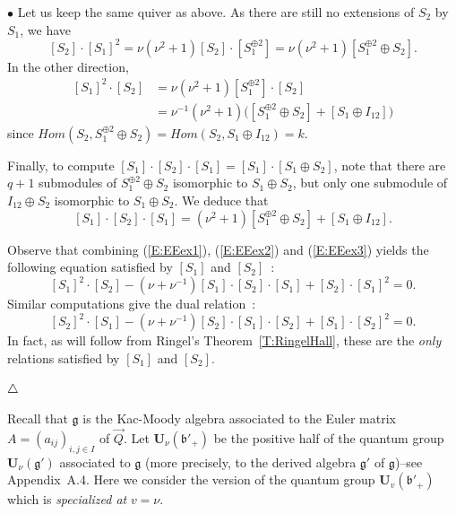 \documentclass[a4paper,10pt]{amsart}
\def\U{\mathbf{U}}
\def\endexample{$\hfill \triangle$}
\def\g{\mathfrak{g}}
\def\bo{\mathfrak{b}}
\def\v{\nu}
\numberwithin{equation}{section}
\begin{document}
\vspace{.05in}

\noindent
$\bullet$ Let us keep the same quiver as above. As there are still no extensions of $S_2$ by $S_1$, we have
\begin{equation}\label{E:EEex1}
[S_2] \cdot [S_1]^2 =\v(\v^2+1)[S_2] \cdot [S_1^{\oplus 2}]= \v(\v^2+1)[S_1^{\oplus 2} \oplus S_2].
\end{equation}
In the other direction,
\begin{equation}\label{E:EEex2}
\begin{split}
[S_1]^2 \cdot [S_2]&= \v(\v^2+1)[S_1^{\oplus 2}] \cdot [S_2]\\
&=\v^{-1}(\v^2+1)\big( [S_1^{\oplus 2} \oplus S_2] + [S_1 \oplus I_{12}] \big)
\end{split}
\end{equation}
since ${Hom}(S_2,S_1^{\oplus 2} \oplus S_2)={Hom}(S_2, S_1 \oplus I_{12})=k$.

Finally, to compute $[S_1] \cdot [S_2] \cdot [S_1]=[S_1] \cdot [S_1 \oplus S_2]$, note that there are $q+1$ submodules of $S_1^{\oplus 2} \oplus S_2$ isomorphic to $S_1 \oplus S_2$, but only one submodule of $I_{12} \oplus S_2$ isomorphic to $S_1 \oplus S_2$. We deduce that
\begin{equation}\label{E:EEex3}
[S_1] \cdot [S_2] \cdot [S_1]= (\v^2+1) [S_1^{\oplus 2} \oplus S_2] + [S_1 \oplus I_{12}].
\end{equation}

Observe that combining (\ref{E:EEex1}), (\ref{E:EEex2}) and (\ref{E:EEex3}) yields the following equation satisfied by $[S_1]$ and $[S_2]$~:
\begin{equation}\label{E:rk21}
[S_1]^2 \cdot [S_2] - (\v+\v^{-1})[S_1]\cdot [S_2] \cdot [S_1] + [S_2] \cdot [S_1]^2=0.
\end{equation}
Similar computations give the dual relation~:
\begin{equation}\label{E:rk22}
[S_2]^2 \cdot [S_1] - (\v+\v^{-1})[S_2]\cdot [S_1] \cdot [S_2] + [S_1] \cdot [S_2]^2=0.
\end{equation}
In fact, as will follow from Ringel's Theorem~\ref{T:RingelHall}, these are the \textit{only} relations satisfied by $[S_1]$ and $[S_2]$.

\endexample

\vspace{.2in}

Recall that $\g$ is the Kac-Moody algebra associated to the Euler matrix $A=(a_{ij})_{i,j \in I}$ of $\vec{Q}$. Let $\U_\nu(\bo'_+)$ be the positive half of the quantum group $\U_\nu(\g')$ associated to $\g$ (more precisely, to the derived algebra $\g'$ of $\g$)--see Appendix~A.4. Here we consider the version of the quantum group $\U_v(\bo'_+)$ which is \textit{specialized at} $v=\nu$.
\end{document}
